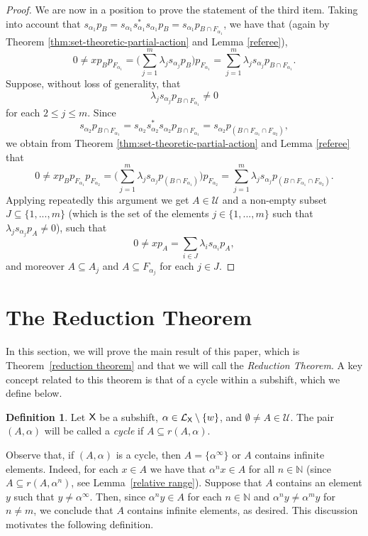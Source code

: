 \documentclass[a4paper,12pt]{amsart}
\theoremstyle{definition}
\newtheorem{definition}[equation]{Definition}
\theoremstyle{remark}
\numberwithin{equation}{section}
\newcommand{\osf}{{\normalfont \textsf{X}}}
\newcommand{\lang}{\CL_{\osf}}
\newcommand{\N}{\mathbb{N}}
\newcommand{\CL}{\mathcal{L}}
\newcommand{\TCB}{\mathcal{U}}
\begin{document}
\begin{proof}
 We are now in a position to prove the statement of the third item. Taking into account that $s_{\alpha_1}p_B=s_{\alpha_1}s_{\alpha_1}^*s_{\alpha_1}p_B=s_{\alpha_1}p_{B\cap F_{{\alpha}_1}}$,
we have that (again by Theorem \ref{thm:set-theoretic-partial-action} and Lemma \ref{referee}),
$$0\neq xp_Bp_{F_{\alpha_1}} = \big(\sum\limits_{j=1}^m \lambda_j s_{\alpha_j}p_{B}\big)p_{F_{\alpha_1}}= \sum\limits_{j=1}^m \lambda_j s_{\alpha_j}p_{B\cap F_{\alpha_1}}.$$ 
Suppose, without loss of generality, that $$\lambda_j s_{\alpha_j}p_{B\cap F_{\alpha_1}}\neq 0$$ for each $2\leq j \leq m$. Since $$s_{\alpha_2}p_{B\cap F_{\alpha_1}}=s_{\alpha_2}s_{\alpha_2}^*s_{\alpha_2}p_{B\cap F_{\alpha_1}}=s_{\alpha_2}p_{(B\cap F_{\alpha_1}\cap F_{\alpha_2})},$$ we obtain from Theorem \ref{thm:set-theoretic-partial-action} and Lemma \ref{referee} that
$$0\neq xp_Bp_{F_{\alpha_1}}p_{F_{\alpha_2}} = \big(\sum\limits_{j=1}^m\lambda_j s_{\alpha_j}p_{(B\cap F_{\alpha_1})}\big)p_{F_{\alpha_2}}=\sum\limits_{j=1}^m\lambda_j s_{\alpha_j}p_{(B\cap F_{\alpha_1}\cap F_{\alpha_2})}.$$
Applying repeatedly this argument we get $A \in \TCB$ and a non-empty subset $J\subseteq \{1,...,m\}$ (which is the set of the elements $j\in \{1,...,m\}$ such that $\lambda_j s_{\alpha_j} p_A\neq 0$), such that 
$$0\neq xp_A=\sum\limits_{i\in J} \lambda_i s_{\alpha_i}p_A,$$ and moreover $A\subseteq A_j$ and $A\subseteq F_{\alpha_j}$ for each $j\in J$.
\end{proof}

\section{The Reduction Theorem}\label{reduction section}

In this section, we will prove the main result of this paper, which is Theorem~\ref{reduction theorem} and that we will call the \emph{Reduction Theorem}. A key concept related to this theorem is that of a cycle within a subshift, which we define below. 

\begin{definition}
    Let $\osf$ be a subshift, $\alpha\in \lang\setminus \{w\}$, and $\emptyset \neq A\in \TCB$. The pair $(A,\alpha)$ will be called  a \emph{cycle} if $A\subseteq r(A,\alpha)$.
\end{definition}

Observe that, if $(A,\alpha)$ is a cycle, then $A=\{\alpha^\infty\}$ or $A$ contains infinite elements. Indeed, for each $x\in A$ we have that $\alpha^n x \in A$ for all $n\in \N$ (since $A\subseteq r(A,\alpha^n)$, see Lemma~\ref{relative range}). Suppose that $A$ contains an element $y$ such that $y\neq \alpha^\infty$. Then, since $\alpha^n y\in A$ for each $n\in \N$ and  $\alpha^n y\neq \alpha^m y$ for $n\neq m$, we conclude that $A$ contains infinite elements, as desired. This discussion motivates the following definition.
\end{document}

